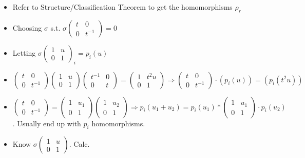 \begin{itemize}
\item Refer to Structure/Classification Theorem to get the homomorphisms $\rho_r$
\item Choosing $\sigma$ s.t. $\sigma\left(\begin{matrix} t&0\\0&t^{-1}\end{matrix}\right) = 0$
\item Letting $\sigma\left(\begin{matrix}1&u\\0&1\end{matrix}\right)_i = p_i(u)$
\item $\left(\begin{matrix}t&0\\0&t^{-1}\end{matrix}\right)
\left(\begin{matrix}1&u\\0&1\end{matrix}\right)
\left(\begin{matrix}t^{-1}& 0\\ 0& t\end{matrix}\right) = 
\left(\begin{matrix}1&t^2u\\0&1\end{matrix}\right)\Rightarrow 
\left(\begin{matrix}t&0\\0&t^{-1}\end{matrix}\right)\cdot\left(p_i(u)\right) = \left(p_i(t^2u)\right)$
\item $\left(\begin{matrix}t&0\\0&t^{-1}\end{matrix}\right)=
\left(\begin{matrix}1&u_1\\0&1\end{matrix}\right)
\left(\begin{matrix}1&u_2\\0&1\end{matrix}\right)\Rightarrow
p_i(u_1+u_2) = p_i(u_1) * \left(\begin{matrix}1&u_1\\0&1\end{matrix}\right)\cdot p_i(u_2)$. 
Usually end up with $p_i$ homomorphisms.
\item Know $\sigma\left(\begin{matrix} 1 & u \\ 0 & 1\end{matrix}\right)$. Calc.

\end{itemize}
